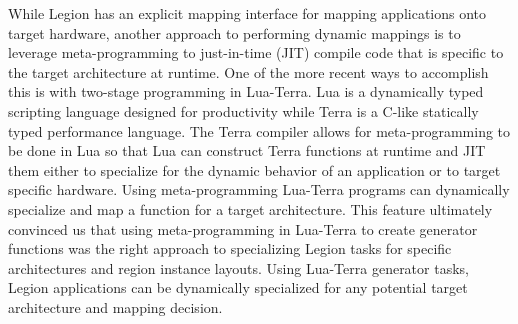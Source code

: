 While Legion has an explicit mapping interface
for mapping applications onto target hardware,
another approach to performing dynamic mappings
is to leverage meta-programming to just-in-time
(JIT) compile code that is specific to the target
architecture at runtime. One of the more recent
ways to accomplish this is with two-stage
programming in Lua-Terra\cite{Terra13}. Lua is
a dynamically typed scripting language designed
for productivity while Terra is a C-like statically
typed performance language. The Terra compiler 
allows for meta-programming to be done in Lua
so that Lua can construct Terra functions at
runtime and JIT them either to specialize for
the dynamic behavior of an application or to
target specific hardware. Using meta-programming
Lua-Terra programs can dynamically specialize
and map a function for a target architecture. This
feature ultimately convinced us that using
meta-programming in Lua-Terra to create generator
functions was the right approach to specializing
Legion tasks for specific architectures and 
region instance layouts. Using Lua-Terra generator
tasks, Legion applications can be dynamically
specialized for any potential target architecture
and mapping decision.

